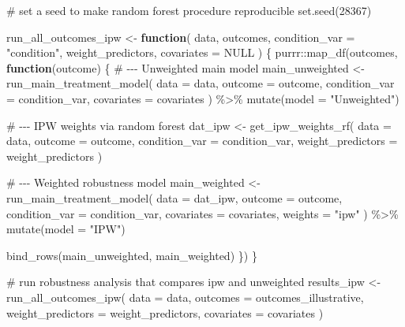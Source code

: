 \documentclass[
  letterpaper,
  DIV=11,
  numbers=noendperiod]{scrartcl}
\newenvironment{Shaded}{\begin{snugshade}}{\end{snugshade}}
\newcommand{\AttributeTok}[1]{\textcolor[rgb]{0.40,0.45,0.13}{#1}}
\newcommand{\CommentTok}[1]{\textcolor[rgb]{0.37,0.37,0.37}{#1}}
\newcommand{\ConstantTok}[1]{\textcolor[rgb]{0.56,0.35,0.01}{#1}}
\newcommand{\ControlFlowTok}[1]{\textcolor[rgb]{0.00,0.23,0.31}{\textbf{#1}}}
\newcommand{\DecValTok}[1]{\textcolor[rgb]{0.68,0.00,0.00}{#1}}
\newcommand{\FunctionTok}[1]{\textcolor[rgb]{0.28,0.35,0.67}{#1}}
\newcommand{\NormalTok}[1]{\textcolor[rgb]{0.00,0.23,0.31}{#1}}
\newcommand{\OtherTok}[1]{\textcolor[rgb]{0.00,0.23,0.31}{#1}}
\newcommand{\SpecialCharTok}[1]{\textcolor[rgb]{0.37,0.37,0.37}{#1}}
\newcommand{\StringTok}[1]{\textcolor[rgb]{0.13,0.47,0.30}{#1}}
\begin{document}
\begin{Shaded}
\begin{Highlighting}[]
\CommentTok{\# set a seed to make random forest procedure reproducible}
\FunctionTok{set.seed}\NormalTok{(}\DecValTok{28367}\NormalTok{)}

\NormalTok{run\_all\_outcomes\_ipw }\OtherTok{\textless{}{-}} \ControlFlowTok{function}\NormalTok{(}
\NormalTok{  data,}
\NormalTok{  outcomes,}
  \AttributeTok{condition\_var =} \StringTok{"condition"}\NormalTok{,}
\NormalTok{  weight\_predictors,}
  \AttributeTok{covariates =} \ConstantTok{NULL}
\NormalTok{) \{}
\NormalTok{  purrr}\SpecialCharTok{::}\FunctionTok{map\_df}\NormalTok{(outcomes, }\ControlFlowTok{function}\NormalTok{(outcome) \{}
    \CommentTok{\# {-}{-}{-} Unweighted main model}
\NormalTok{    main\_unweighted }\OtherTok{\textless{}{-}} \FunctionTok{run\_main\_treatment\_model}\NormalTok{(}
      \AttributeTok{data =}\NormalTok{ data,}
      \AttributeTok{outcome =}\NormalTok{ outcome,}
      \AttributeTok{condition\_var =}\NormalTok{ condition\_var,}
      \AttributeTok{covariates =}\NormalTok{ covariates}
\NormalTok{    ) }\SpecialCharTok{\%\textgreater{}\%}
      \FunctionTok{mutate}\NormalTok{(}\AttributeTok{model =} \StringTok{"Unweighted"}\NormalTok{)}

    \CommentTok{\# {-}{-}{-} IPW weights via random forest}
\NormalTok{    dat\_ipw }\OtherTok{\textless{}{-}} \FunctionTok{get\_ipw\_weights\_rf}\NormalTok{(}
      \AttributeTok{data =}\NormalTok{ data,}
      \AttributeTok{outcome =}\NormalTok{ outcome,}
      \AttributeTok{condition\_var =}\NormalTok{ condition\_var,}
      \AttributeTok{weight\_predictors =}\NormalTok{ weight\_predictors}
\NormalTok{    )}

    \CommentTok{\# {-}{-}{-} Weighted robustness model}
\NormalTok{    main\_weighted }\OtherTok{\textless{}{-}} \FunctionTok{run\_main\_treatment\_model}\NormalTok{(}
      \AttributeTok{data =}\NormalTok{ dat\_ipw,}
      \AttributeTok{outcome =}\NormalTok{ outcome,}
      \AttributeTok{condition\_var =}\NormalTok{ condition\_var,}
      \AttributeTok{covariates =}\NormalTok{ covariates,}
      \AttributeTok{weights =} \StringTok{"ipw"}
\NormalTok{    ) }\SpecialCharTok{\%\textgreater{}\%}
      \FunctionTok{mutate}\NormalTok{(}\AttributeTok{model =} \StringTok{"IPW"}\NormalTok{)}

    \FunctionTok{bind\_rows}\NormalTok{(main\_unweighted, main\_weighted)}
\NormalTok{  \})}
\NormalTok{\}}

\CommentTok{\# run robustness analysis that compares ipw and unweighted}
\NormalTok{results\_ipw }\OtherTok{\textless{}{-}} \FunctionTok{run\_all\_outcomes\_ipw}\NormalTok{(}
  \AttributeTok{data =}\NormalTok{ data,}
  \AttributeTok{outcomes =}\NormalTok{ outcomes\_illustrative,}
  \AttributeTok{weight\_predictors =}\NormalTok{ weight\_predictors,}
  \AttributeTok{covariates =}\NormalTok{ covariates}
\NormalTok{)}
\end{Highlighting}
\end{Shaded}
\end{document}
